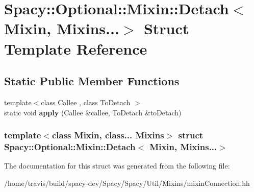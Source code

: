 \hypertarget{structSpacy_1_1Optional_1_1Mixin_1_1Detach_3_01Mixin_00_01Mixins_8_8_8_4}{\section{\-Spacy\-:\-:\-Optional\-:\-:\-Mixin\-:\-:\-Detach$<$ \-Mixin, \-Mixins...$>$ \-Struct \-Template \-Reference}
\label{structSpacy_1_1Optional_1_1Mixin_1_1Detach_3_01Mixin_00_01Mixins_8_8_8_4}
}
\subsection*{\-Static \-Public \-Member \-Functions}
\begin{DoxyCompactItemize}
\item 
\hypertarget{structSpacy_1_1Optional_1_1Mixin_1_1Detach_3_01Mixin_00_01Mixins_8_8_8_4_a4e59ecaaca0c46c39f3020f0b2c1dc91}{{\footnotesize template$<$class Callee , class To\-Detach $>$ }\\static void {\bfseries apply} (\-Callee \&callee, \-To\-Detach \&to\-Detach)}\label{structSpacy_1_1Optional_1_1Mixin_1_1Detach_3_01Mixin_00_01Mixins_8_8_8_4_a4e59ecaaca0c46c39f3020f0b2c1dc91}

\end{DoxyCompactItemize}
\subsubsection*{template$<$class Mixin, class... \-Mixins$>$ struct Spacy\-::\-Optional\-::\-Mixin\-::\-Detach$<$ Mixin, Mixins...$>$}



\-The documentation for this struct was generated from the following file\-:\begin{DoxyCompactItemize}
\item 
/home/travis/build/spacy-\/dev/\-Spacy/\-Spacy/\-Util/\-Mixins/mixin\-Connection.\-hh\end{DoxyCompactItemize}
